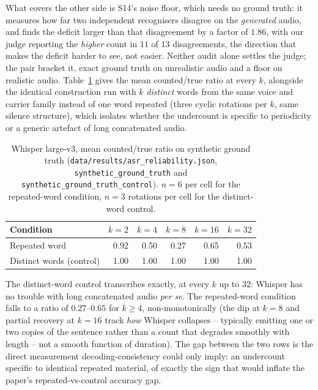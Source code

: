 \documentclass[11pt]{article}
\begin{document}
What covers the other side is S14's noise floor, which needs no ground truth: it
measures how far two independent recognisers disagree on the \emph{generated}
audio, and finds the deficit larger than that disagreement by a factor of
$1.86$, with our judge reporting the \emph{higher} count in $11$ of $13$
disagreements, the direction that makes the deficit harder to see, not
easier. Neither audit alone settles the judge; the pair bracket it, exact
ground truth on unrealistic audio and a floor on realistic audio.
Table~\ref{tab:asraudit-b} gives the mean counted/true ratio at every $k$,
alongside the identical construction run with $k$ \emph{distinct} words from
the same voice and carrier family instead of one word repeated (three cyclic
rotations per $k$, same silence structure), which isolates whether the
undercount is specific to periodicity or a generic artefact of long
concatenated audio.

\begin{table}[h]
\centering
\caption{Whisper large-v3, mean counted/true ratio on synthetic ground truth
(\texttt{data/results/asr\_reliability.json}, \texttt{synthetic\_ground\_truth}
and \texttt{synthetic\_ground\_truth\_control}). $n{=}6$ per cell for the
repeated-word condition, $n{=}3$ rotations per cell for the distinct-word
control.}
\label{tab:asraudit-b}
\small
\begin{tabular}{@{}lrrrrr@{}}
\toprule
Condition & $k{=}2$ & $k{=}4$ & $k{=}8$ & $k{=}16$ & $k{=}32$ \\
\midrule
Repeated word & 0.92 & 0.50 & 0.27 & 0.65 & 0.53 \\
Distinct words (control) & 1.00 & 1.00 & 1.00 & 1.00 & 1.00 \\
\bottomrule
\end{tabular}
\end{table}

The distinct-word control transcribes exactly, at every $k$ up to $32$:
Whisper has no trouble with long concatenated audio \emph{per se}. The
repeated-word condition falls to a ratio of $0.27$--$0.65$ for $k\ge4$,
non-monotonically (the dip at $k{=}8$ and partial recovery at $k{=}16$ track
\emph{how} Whisper collapses -- typically emitting one or two copies of the
sentence rather than a count that degrades smoothly with length -- not a
smooth function of duration). The gap between the two rows is the direct
measurement decoding-consistency could only imply: an undercount specific to
identical repeated material, of exactly the sign that would inflate the
paper's repeated-vs-control accuracy gap.
\end{document}
